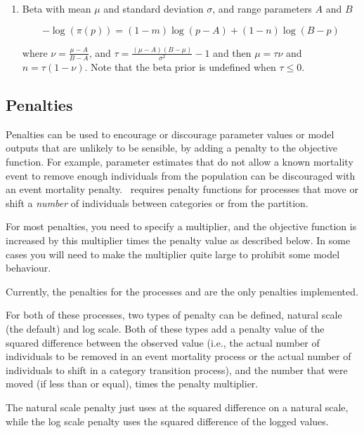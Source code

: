 \begin{enumerate}
\item{Beta with mean $\mu$ and standard deviation $\sigma$, and range parameters $A$ and $B$}

\begin{equation}
 - \log \left(\pi \left( p \right) \right) = \left( 1 - m \right) \log \left( p - A \right) + \left( 1 - n \right)\log \left( B - p \right)
\end{equation}

where $\nu  = \frac{\mu  - A}{B - A}$, and $\tau = \frac{\left(\mu -A \right)\left(B - \mu \right)}{\sigma ^2} - 1$ and then $\mu=\tau \nu$ and $n=\tau(1-\nu)$. Note that the beta prior is undefined when $\tau \leq 0$.

\end{enumerate}

\subsection{Penalties\label{sec:penalties}}

Penalties can be used to encourage or discourage parameter values or model outputs that are unlikely to be sensible, by adding a penalty to the objective function. For example, parameter estimates that do not allow a known mortality event to remove enough individuals from the population can be discouraged with an event mortality penalty. \SPM\ requires penalty functions for processes that move or shift a \emph{number} of individuals between categories or from the partition.

For most penalties, you need to specify a multiplier, and the objective function is increased by this multiplier times the penalty value as described below. In some cases you will need to make the multiplier quite large to prohibit some model behaviour. 

Currently, the penalties for the processes  and  are the only penalties implemented. 

For both of these processes, two types of penalty can be defined, natural scale (the default) and log scale. Both of these types add a penalty value of the squared difference between the observed value (i.e., the actual number of individuals to be removed in an event mortality process or the actual number of individuals to shift in a category transition process), and the number that were moved (if less than or equal), times the penalty multiplier.

The natural scale penalty just uses at the squared difference on a natural scale, while the log scale penalty uses the squared difference of the logged values. 
